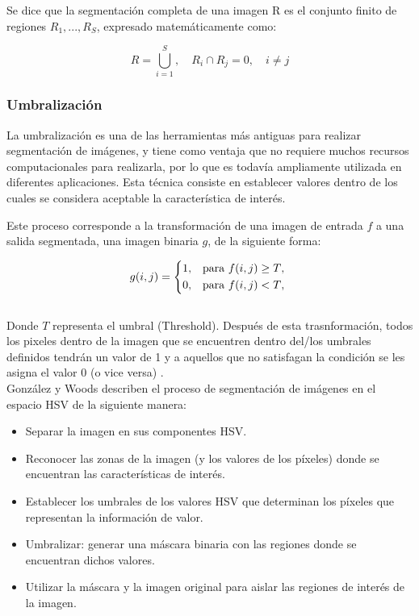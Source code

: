 Se dice que la segmentación completa de una imagen R es el conjunto finito de regiones $R_{1}, ..., R_{S}$, expresado matemáticamente como: 

\begin{equation*}
R = \bigcup^{S}_{i = 1}, \quad
R_{i} \cap R_{j} = 0, \quad
i \neq j
\end{equation*}

\subsubsection{Umbralización}
La umbralización es una de las herramientas más antiguas para realizar segmentación de imágenes, y tiene como ventaja que no requiere muchos recursos computacionales para realizarla, por lo que es todavía ampliamente utilizada en diferentes aplicaciones. Esta técnica consiste en establecer valores dentro de los cuales se considera aceptable la característica de interés.

Este proceso corresponde a la transformación de una imagen de entrada $f$ a una salida segmentada, una imagen binaria $g$, de la siguiente forma:

\begin{equation*}
g(i,j) =\begin{cases*}
1, & para $f(i,j) \geq T$,\\
0, & para $f(i,j) < T$,
\end{cases*}
\end{equation*}
\phantom{saltodelinea}\\

Donde $T$ representa el umbral (Threshold). Después de esta trasnformación, todos los pixeles dentro de la imagen que se encuentren dentro del/los umbrales definidos tendrán un valor de 1 y a aquellos que no satisfagan la condición se les asigna el valor 0 (o vice versa) \cite{sonka_image_2008}.
\phantom{saltodelinea}\\


 González y Woods \cite{gonzalez_digital_2002} describen el proceso de segmentación de imágenes en el espacio HSV de la siguiente manera:
\begin{itemize}
    \item Separar la imagen en sus componentes HSV.
    \item Reconocer las zonas de la imagen (y los valores de los píxeles) donde se encuentran las características de interés.
    \item Establecer los umbrales de los valores HSV que determinan los píxeles que representan la información de valor.
    \item Umbralizar: generar una máscara binaria con las regiones donde se encuentran dichos valores.
    \item Utilizar la máscara y la imagen original para aislar las regiones de interés de la imagen.
\end{itemize}



